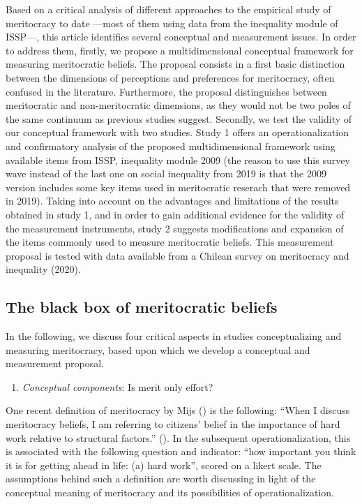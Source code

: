 \documentclass[
  10pt,
  a4paper,
]{article}
\providecommand{\tightlist}{%
  \setlength{\itemsep}{0pt}\setlength{\parskip}{0pt}}
\begin{document}
Based on a critical analysis of different approaches to the empirical study of meritocracy to date ---most of them using data from the inequality module of ISSP---, this article identifies several conceptual and measurement issues. In order to address them, firstly, we propose a multidimensional conceptual framework for measuring meritocratic beliefs. The proposal consists in a first basic distinction between the dimensions of perceptions and preferences for meritocracy, often confused in the literature. Furthermore, the proposal distinguishes between meritocratic and non-meritocratic dimensions, as they would not be two poles of the same continuum as previous studies suggest. Secondly, we test the validity of our conceptual framework with two studies. Study 1 offers an operationalization and confirmatory analysis of the proposed multidimensional framework using available items from ISSP, inequality module 2009 (the reason to use this survey wave instead of the last one on social inequality from 2019 is that the 2009 version includes some key items used in meritocratic reserach that were removed in 2019). Taking into account on the advantages and limitations of the results obtained in study 1, and in order to gain additional evidence for the validity of the measurement instruments, study 2 suggests modifications and expansion of the items commonly used to measure meritocratic beliefs. This measurement proposal is tested with data available from a Chilean survey on meritocracy and inequality (2020).

\subsection*{The black box of meritocratic beliefs}\label{blackbox}

In the following, we discuss four critical aspects in studies conceptualizing and measuring meritocracy, based upon which we develop a conceptual and measurement proposal.

\begin{enumerate}
\def\labelenumi{\alph{enumi}.}
\tightlist
\item
  \emph{Conceptual components}: Is merit only effort?
\end{enumerate}

One recent definition of meritocracy by Mijs () is the following: ``When I discuss meritocracy beliefs, I am referring to citizens' belief in the importance of hard work relative to structural factors.'' (). In the subsequent operationalization, this is associated with the following question and indicator: ``how important you think it is for getting ahead in life: (a) hard work'', scored on a likert scale. The assumptions behind such a definition are worth discussing in light of the conceptual meaning of meritocracy and its possibilities of operationalization.
\end{document}
